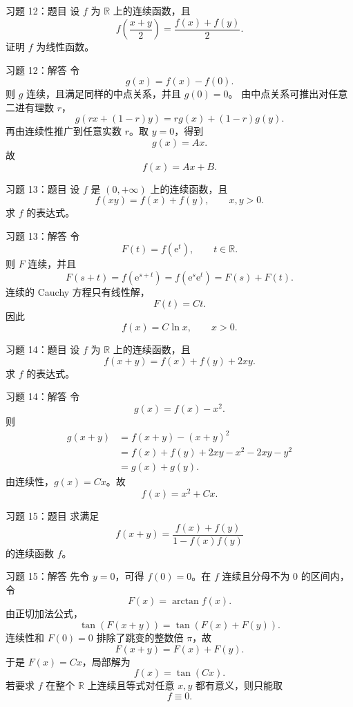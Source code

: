 \documentclass[aspectratio=169,10pt]{ctexbeamer}
\newcommand{\R}{\mathbb{R}}
\newcommand{\ee}{\mathrm{e}}
\begin{document}
\begin{frame}[t]{习题 12：题目}
\small
设 $f$ 为 $\R$ 上的连续函数，且
\[
  f\left(\frac{x+y}{2}\right)=\frac{f(x)+f(y)}2.
\]
证明 $f$ 为线性函数。
\end{frame}

\begin{frame}[t]{习题 12：解答}
\small
令
\[
  g(x)=f(x)-f(0).
\]
则 $g$ 连续，且满足同样的中点关系，并且 $g(0)=0$。
由中点关系可推出对任意二进有理数 $r$，
\[
  g(rx+(1-r)y)=rg(x)+(1-r)g(y).
\]
再由连续性推广到任意实数 $r$。取 $y=0$，得到
\[
  g(x)=Ax.
\]
故
\[
\boxed{f(x)=Ax+B.}
\]
\end{frame}

\begin{frame}[t]{习题 13：题目}
\small
设 $f$ 是 $(0,+\infty)$ 上的连续函数，且
\[
  f(xy)=f(x)+f(y),\qquad x,y>0.
\]
求 $f$ 的表达式。
\end{frame}

\begin{frame}[t]{习题 13：解答}
\small
令
\[
  F(t)=f(\ee^t),\qquad t\in\R.
\]
则 $F$ 连续，并且
\[
  F(s+t)=f(\ee^{s+t})=f(\ee^s\ee^t)=F(s)+F(t).
\]
连续的 Cauchy 方程只有线性解，
\[
  F(t)=Ct.
\]
因此
\[
\boxed{f(x)=C\ln x,\qquad x>0.}
\]
\end{frame}

\begin{frame}[t]{习题 14：题目}
\small
设 $f$ 为 $\R$ 上的连续函数，且
\[
  f(x+y)=f(x)+f(y)+2xy.
\]
求 $f$ 的表达式。
\end{frame}

\begin{frame}[t]{习题 14：解答}
\small
令
\[
  g(x)=f(x)-x^2.
\]
则
\[
\begin{aligned}
g(x+y)
&=f(x+y)-(x+y)^2\\
&=f(x)+f(y)+2xy-x^2-2xy-y^2\\
&=g(x)+g(y).
\end{aligned}
\]
由连续性，$g(x)=Cx$。故
\[
\boxed{f(x)=x^2+Cx.}
\]
\end{frame}

\begin{frame}[t]{习题 15：题目}
\small
求满足
\[
  f(x+y)=\frac{f(x)+f(y)}{1-f(x)f(y)}
\]
的连续函数 $f$。
\end{frame}

\begin{frame}[t]{习题 15：解答}
\footnotesize
先令 $y=0$，可得 $f(0)=0$。在 $f$ 连续且分母不为 $0$ 的区间内，令
\[
  F(x)=\arctan f(x).
\]
由正切加法公式，
\[
  \tan(F(x+y))=\tan(F(x)+F(y)).
\]
连续性和 $F(0)=0$ 排除了跳变的整数倍 $\pi$，故
\[
  F(x+y)=F(x)+F(y).
\]
于是 $F(x)=Cx$，局部解为
\[
\boxed{f(x)=\tan(Cx).}
\]
若要求 $f$ 在整个 $\R$ 上连续且等式对任意 $x,y$ 都有意义，则只能取
\[
\boxed{f\equiv0.}
\]
\end{frame}
\end{document}
